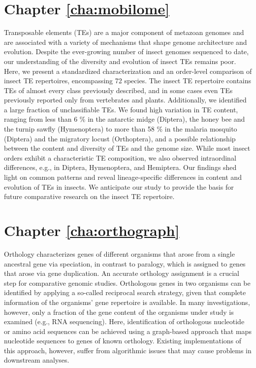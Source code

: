 
\section*{Chapter \ref{cha:mobilome}}
Transposable elements (TEs) are a major component of metazoan genomes
and are associated with a variety of mechanisms that shape genome
architecture and evolution. Despite the ever-growing number of insect
genomes sequenced to date, our understanding of the diversity and
evolution of insect TEs remains poor. Here, we present a standardized
characterization and an order-level comparison of insect TE repertoires,
encompassing 72 species. The insect TE repertoire contains TEs of almost
every class previously described, and in some cases even TEs previously
reported only from vertebrates and plants. Additionally, we identified a
large fraction of unclassifiable TEs. We found high variation in TE
content, ranging from less than 6 \% in the antarctic midge (Diptera),
the honey bee and the turnip sawfly (Hymenoptera) to more than 58 \% in
the malaria mosquito (Diptera) and the migratory locust (Orthoptera),
and a possible relationship between the content and diversity of TEs and
the genome size. While most insect orders exhibit a characteristic TE
composition, we also observed intraordinal differences, e.g., in
Diptera, Hymenoptera, and Hemiptera. Our findings shed light on common
patterns and reveal lineage-specific differences in content and
evolution of TEs in insects. We anticipate our study to provide the
basis for future comparative research on the insect TE repertoire.%


\section*{Chapter \ref{cha:orthograph}}
Orthology characterizes genes of different organisms that arose from a
single ancestral gene via speciation, in contrast to paralogy, which is
assigned to genes that arose via gene duplication. An accurate orthology
assignment is a crucial step for comparative genomic studies.
Orthologous genes in two organisms can be identified by applying a
so-called reciprocal search strategy, given that complete information of
the organisms' gene repertoire is available. In many investigations,
however, only a fraction of the gene content of the organisms under
study is examined (e.g., RNA sequencing).  Here, identification of
orthologous nucleotide or amino acid sequences can be achieved using a
graph-based approach that maps nucleotide sequences to genes of known
orthology. Existing implementations of this approach, however, suffer
from algorithmic issues that may cause problems in downstream analyses.

